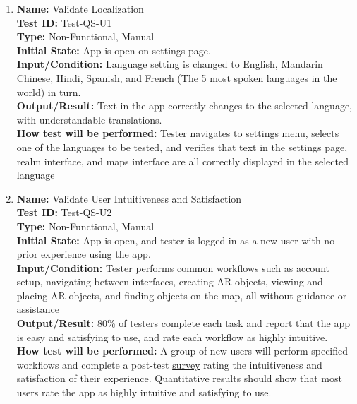 \documentclass[12pt, titlepage]{article}
\begin{document}
\begin{enumerate}

  \item \textbf{Name:} Validate Localization \label{itm:Test-QS-U1} \\
        \textbf{Test ID:} Test-QS-U1 \\
        \textbf{Type:} Non-Functional, Manual \\
        \textbf{Initial State:} App is open on settings page. \\
        \textbf{Input/Condition:} Language setting is changed to English, Mandarin Chinese, Hindi, Spanish, and French (The 5 most spoken languages in the world) in turn.  \\
        \textbf{Output/Result:} Text in the app correctly changes to the selected language, with understandable translations. \\
        \textbf{How test will be performed:} Tester navigates to settings menu, selects one of the languages to be tested, and verifies that text in the settings page, realm interface, and maps interface are all correctly displayed in the selected language

  \item \textbf{Name:} Validate User Intuitiveness and Satisfaction \label{itm:Test-QS-U2} \\
        \textbf{Test ID:} Test-QS-U2 \\
        \textbf{Type:} Non-Functional, Manual \\
        \textbf{Initial State:} App is open, and tester is logged in as a new user with no prior experience using the app. \\
        \textbf{Input/Condition:} Tester performs common workflows such as account setup, navigating between interfaces, creating AR objects, viewing and placing AR objects, and finding objects on the map, all without guidance or assistance  \\
        \textbf{Output/Result:} 80\% of testers complete each task and report that the app is easy and satisfying to use, and rate each workflow as highly intuitive.\\
        \textbf{How test will be performed:} A group of new users will perform specified workflows and complete a post-test \hyperref[sub:usability_survey]{survey} rating the intuitiveness and satisfaction of their experience. Quantitative results should show that most users rate the app as highly intuitive and satisfying to use.

\end{enumerate}
\end{document}
